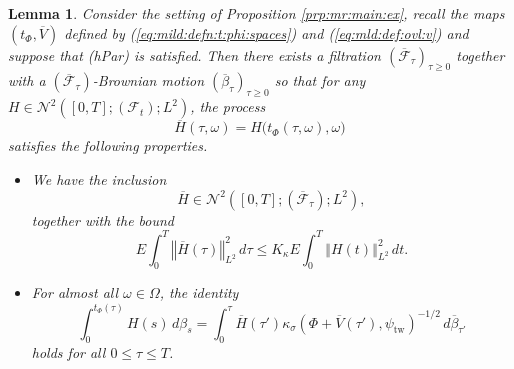 \documentclass[10pt]{articleHJ}
\newcommand{\norm}[1]{\left\Vert#1\right\Vert}		%
\newcommand{\sref}[1]{(\ref{#1})}                       %
\newtheorem{lem}[thm]{Lemma}
\numberwithin{equation}{section}
\begin{document}
\begin{lem}
\label{lem:md:timechange}
Consider the setting of Proposition \ref{prp:mr:main:ex},
recall the maps $(t_{\Phi}, \overline{V} )$
defined by  \sref{eq:mild:defn:t:phi:spaces}
and \sref{eq:mld:def:ovl:v}
and  suppose that (hPar) is satisfied.
%
Then there exists a filtration
$(\overline{\mathcal{F}}_{\tau})_{\tau \ge 0}$
together with a $(\overline{\mathcal{F}}_{\tau})$-Brownian motion
$(\overline{\beta}_{\tau})_{\tau \ge 0}$
so that for any
$H \in \mathcal{N}^2([0,T] ; (\mathcal{F}_t) ; L^2)$,
the process
\begin{equation}
\overline{H}(\tau, \omega) = H\big( t_\Phi(\tau,\omega), \omega \big)
\end{equation}
satisfies the following properties.
\begin{itemize}
\item[(i)]{
  We have the inclusion
  \begin{equation}
    \overline{H} \in \mathcal{N}^2( [0, T] ;
      (\overline{\mathcal{F}}_{\tau}) ; L^2) ,
  \end{equation}
  together with the bound
  \begin{equation}
    \label{eq:mild:l2:transform:bnd}
    E \int_0^T \norm{\overline{H}(\tau)}_{L^2}^2 \, d \tau
    \le K_{\kappa} E \int_0^T \norm{H(t)}_{L^2}^2 \, d t .
  \end{equation}
}
\item[(ii)]{
  For almost all $\omega \in \Omega$, the identity
  \begin{equation}
    \label{eq:mild:time:transf:st:int:transf}
    \int_0^{t_\Phi(\tau)} H(s) \, d \beta_s
    = \int_0^\tau \overline{H}(\tau')
      \kappa_{\sigma}(\Phi + \overline{V}(\tau') , \psi_{\mathrm{tw}} )^{-1/2}
        \, d \overline{\beta}_{\tau'}
  \end{equation}
  holds for all $0 \le \tau \le T$.
}
\end{itemize}
\end{lem}
\end{document}
